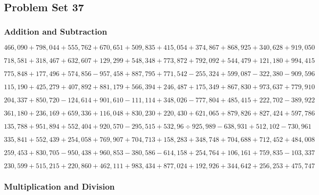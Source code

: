\hypertarget{problem-set-37-5}{%
\subsection{Problem Set 37}\label{problem-set-37-5}}

\hypertarget{addition-and-subtraction-342}{%
\subsubsection{Addition and
Subtraction}\label{addition-and-subtraction-342}}

\(466,090+798,044+555,762+670,651+509,835+415,054+374,867+868,925+340,628+ 919,050\)

\(718,581+318,467+632,607+129,299+548,348+773,872+792,092+544,479+121,180+994,415\)

\(775,848+177,496+574,856-957,458+887,795+771,542-255,324+599,087-322,380-909,596\)

\(115,190+425,279+407,892+881,179+566,394+246,487+175,349+867,830+973,637+779,910\)

\(204,337+850,720-124,614+901,610-111,114+348,026-777,804+485,415+222,702-389,922\)

\(361,180+236,169+659,336+116,048+830,230+220,430+621,065+879,826+827,424+597,786\)

\(135,788+951,894+552,404+920,570-295,515+532,96÷925,989-638,931+512,102-730,961\)

\(335,841+552,439+254,058+769,907+704,713+158,283+348,748+704,688+712,452+484,008\)

\(259,453+830,705-950,438+960,853-380,586-614,158+254,764+106,161+759,835-103,337\)

\(230,599+515,215+220,860+462,111+983,434+877,024+192,926+344,642+256,253+475,747\)

\hypertarget{multiplication-and-division-341}{%
\subsubsection{Multiplication and
Division}\label{multiplication-and-division-341}}


